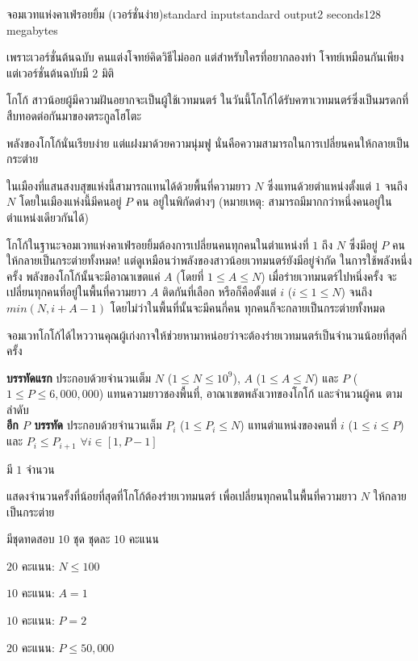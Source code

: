 \documentclass[11pt,a4paper]{article}
\begin{document}
\begin{problem}{จอมเวทแห่งคาเฟ่รอยยิ้ม (เวอร์ชั่นง่าย)}{standard input}{standard output}{2 seconds}{128 megabytes}

เพราะเวอร์ชั่นต้นฉบับ คนแต่งโจทย์คิดวิธีไม่ออก แต่สำหรับใครที่อยากลองทำ โจทย์เหมือนกันเพียงแต่เวอร์ชั่นต้นฉบับมี 2 มิติ

โกโก้ สาวน้อยผู้มีความฝันอยากจะเป็นผู้ใช้เวทมนตร์ ในวันนี้โกโก้ได้รับคฑาเวทมนตร์ซึ่งเป็นมรดกที่สืบทอดต่อกันมาของตระกูลโฮโตะ

พลังของโกโก้นั่นเรียบง่าย แต่แฝงมาด้วยความนุ่มฟู นั่นคือความสามารถในการเปลี่ยนคนให้กลายเป็นกระต่าย

ในเมืองที่แสนสงบสุขแห่งนี้สามารถแทนได้ด้วยพื้นที่ความยาว $N$ ซึ่งแทนด้วยตำแหน่งตั้งแต่ $1$ จนถึง $N$ โดยในเมืองแห่งนี้มีคนอยู่ $P$ คน อยู่ในพิกัดต่างๆ (หมายเหตุ: สามารถมีมากกว่าหนึ่งคนอยู่ในตำแหน่งเดียวกันได้)

โกโก้ในฐานะจอมเวทแห่งคาเฟ่รอยยิ้มต้องการเปลี่ยนคนทุกคนในตำแหน่งที่ $1$ ถึง $N$ ซึ่งมีอยู่ $P$ คน ให้กลายเป็นกระต่ายทั้งหมด! แต่ดูเหมือนว่าพลังของสาวน้อยเวทมนตร์ยังมีอยู่จำกัด ในการใช้พลังหนึ่งครั้ง พลังของโกโก้นั้นจะมีอาณาเขตแค่ $A$ (โดยที่ $1 \le A \le N$) เมื่อร่ายเวทมนตร์ไปหนึ่งครั้ง จะเปลี่ยนทุกคนที่อยู่ในพื้นที่ความยาว $A$ ติดกันที่เลือก หรือก็คือตั้งแต่ $i$ ($i \le 1 \le N$) จนถึง $min(N, i+A-1)$ โดยไม่ว่าในพื้นที่นั้นจะมีคนกี่คน ทุกคนก็จะกลายเป็นกระต่ายทั้งหมด

จอมเวทโกโก้ได้ไหววานคุณผู้เก่งกาจให้ช่วยหามาหน่อยว่าจะต้องร่ายเวทมนตร์เป็นจำนวนน้อยที่สุดกี่ครั้ง

\InputFile

\textbf{บรรทัดแรก} ประกอบด้วยจำนวนเต็ม $N$ ($1 \le N \le 10^9$), $A$ ($1 \le A \le N$) และ $P$ ($1 \le P \le 6,000,000$) แทนความยาวชองพื้นที่, อาณาเขตพลังเวทของโกโก้ และจำนวนผู้คน ตามลำดับ \\
\textbf{อีก $P$ บรรทัด} ประกอบด้วยจำนวนเต็ม $P_i$ ($1 \le P_i \le N$) แทนตำแหน่งของคนที่ $i$ ($1 \le i \le P$) และ $P_i \le P_{i+1}$ $\forall i \in [1, P-1]$

\OutputFile
มี $1$ จำนวน

แสดงจำนวนครั้งที่น้อยที่สุดที่โกโก้ต้องร่ายเวทมนตร์ เพื่อเปลี่ยนทุกคนในพื้นที่ความยาว $N$ ให้กลายเป็นกระต่าย

\Scoring
มีชุดทดสอบ $10$ ชุด ชุดละ $10$ คะแนน

$20$ คะแนน: $N \le 100$

$10$ คะแนน: $A = 1$

$10$ คะแนน: $P = 2$

$20$ คะแนน: $P \le 50,000$


\end{problem}
\end{document}
